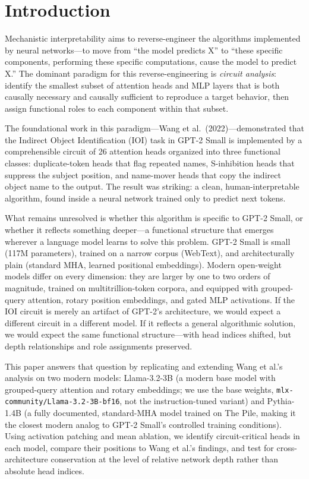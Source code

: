 \documentclass[11pt,a4paper]{article}
\begin{document}
\section{Introduction}
\label{sec:intro}

Mechanistic interpretability aims to reverse-engineer the algorithms implemented by
neural networks---to move from ``the model predicts X'' to ``these specific
components, performing these specific computations, cause the model to predict X.''
The dominant paradigm for this reverse-engineering is \emph{circuit analysis}:
identify the smallest subset of attention heads and MLP layers that is both causally
necessary and causally sufficient to reproduce a target behavior, then assign
functional roles to each component within that subset.

The foundational work in this paradigm---Wang et al.\ (2022)---demonstrated that the
Indirect Object Identification (IOI) task in GPT-2 Small is implemented by a
comprehensible circuit of 26 attention heads organized into three functional classes:
duplicate-token heads that flag repeated names, S-inhibition heads that suppress the
subject position, and name-mover heads that copy the indirect object name to the
output. The result was striking: a clean, human-interpretable algorithm, found inside
a neural network trained only to predict next tokens.

What remains unresolved is whether this algorithm is specific to GPT-2 Small, or
whether it reflects something deeper---a functional structure that emerges wherever a
language model learns to solve this problem. GPT-2 Small is small (117M parameters),
trained on a narrow corpus (WebText), and architecturally plain (standard MHA, learned
positional embeddings). Modern open-weight models differ on every dimension: they are
larger by one to two orders of magnitude, trained on multitrillion-token corpora, and
equipped with grouped-query attention, rotary position embeddings, and gated MLP
activations. If the IOI circuit is merely an artifact of GPT-2's architecture, we
would expect a different circuit in a different model. If it reflects a general
algorithmic solution, we would expect the same functional structure---with head indices
shifted, but depth relationships and role assignments preserved.

This paper answers that question by replicating and extending Wang et al.'s analysis
on two modern models: Llama-3.2-3B \citep{meta2024llama32} (a modern base model with
grouped-query attention and rotary embeddings; we use the base weights,
\texttt{mlx-community/Llama-3.2-3B-bf16}, not the instruction-tuned variant) and Pythia-1.4B
\citep{biderman2023pythia} (a fully documented, standard-MHA model trained on The
Pile, making it the closest modern analog to GPT-2 Small's controlled training
conditions). Using activation patching and mean ablation, we identify circuit-critical
heads in each model, compare their positions to Wang et al.'s findings, and test for
cross-architecture conservation at the level of relative network depth rather than
absolute head indices.
\end{document}

